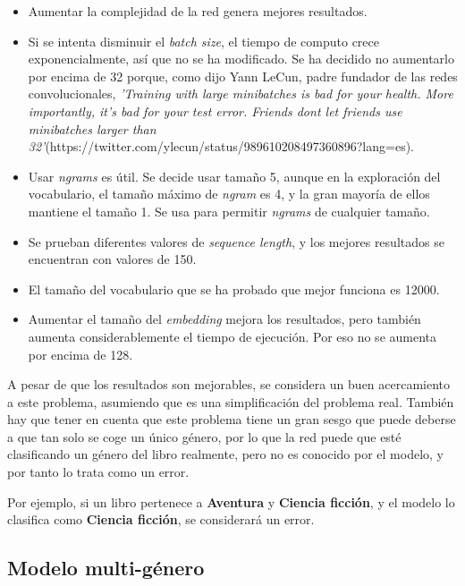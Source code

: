 \documentclass[12pt,a4paper, xcolor=table]{article}
\begin{document}
\begin{itemize}
  \item Aumentar la complejidad de la red genera mejores resultados.
  \item Si se intenta disminuir el \textit{batch size}, el tiempo de computo crece exponencialmente, así que no se ha modificado. Se ha decidido no aumentarlo por encima de 32 porque, como dijo Yann LeCun, padre fundador de las redes convolucionales, \textit{'Training with large minibatches is bad for your health. More importantly, it's bad for your test error. Friends dont let friends use minibatches larger than 32'}(https://twitter.com/ylecun/status/989610208497360896?lang=es).
  \item Usar \textit{ngrams} es útil. Se decide usar tamaño 5, aunque en la exploración del vocabulario, el tamaño máximo de \textit{ngram} es 4, y la gran mayoría de ellos mantiene el tamaño 1. Se usa para permitir \textit{ngrams} de cualquier tamaño.
  \item Se prueban diferentes valores de \textit{sequence length}, y los mejores resultados se encuentran con valores de 150.
  \item El tamaño del vocabulario que se ha probado que mejor funciona es 12000.
  \item Aumentar el tamaño del \textit{embedding} mejora los resultados, pero también aumenta considerablemente el tiempo de ejecución. Por eso no se aumenta por encima de 128.
\end{itemize}

  A pesar de que los resultados son mejorables, se considera un buen acercamiento a este problema, asumiendo que es una simplificación del problema real. También hay que tener en cuenta que este problema tiene un gran sesgo que puede deberse a que tan solo se coge un único género, por lo que la red puede que esté clasificando un género del libro realmente, pero no es conocido por el modelo, y por tanto lo trata como un error.

  \vspace{2mm}

  Por ejemplo, si un libro pertenece a \textbf{Aventura} y \textbf{Ciencia ficción}, y el modelo lo clasifica como \textbf{Ciencia ficción}, se considerará un error.



\subsection{Modelo multi-género}
\end{document}
